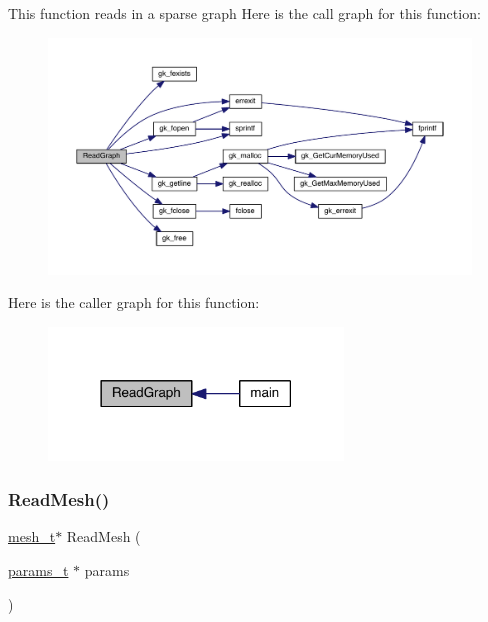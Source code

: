 This function reads in a sparse graph Here is the call graph for this function\+:\nopagebreak
\begin{figure}[H]
\begin{center}
\leavevmode
\includegraphics[width=350pt]{a00948_ac8fe4a21ae3e0e01afdba3fedf1c6123_cgraph}
\end{center}
\end{figure}
Here is the caller graph for this function\+:\nopagebreak
\begin{figure}[H]
\begin{center}
\leavevmode
\includegraphics[width=222pt]{a00948_ac8fe4a21ae3e0e01afdba3fedf1c6123_icgraph}
\end{center}
\end{figure}
\mbox{\label{a00948_aef01a8b2c6432d21be77abeabeeeced8}} 
\subsubsection{\texorpdfstring{Read\+Mesh()}{ReadMesh()}}
{\footnotesize\ttfamily \hyperlink{a00738}{mesh\+\_\+t}$\ast$ Read\+Mesh (\begin{DoxyParamCaption}\item[{\hyperlink{a00706}{params\+\_\+t} $\ast$}]{params }\end{DoxyParamCaption})}


